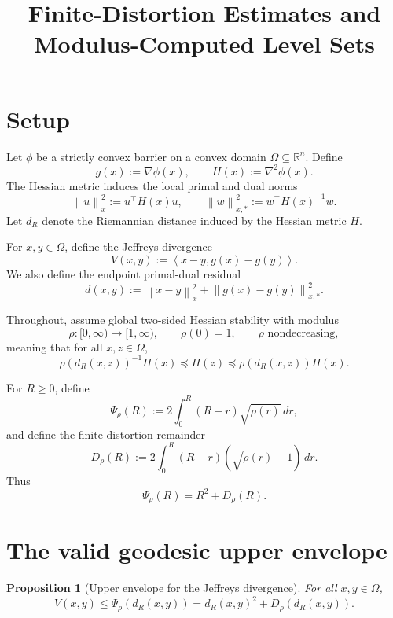\documentclass[11pt]{article}
\title{Finite-Distortion Estimates and Modulus-Computed Level Sets}
\author{}
\date{}
\newtheorem{proposition}{Proposition}
\newcommand{\R}{\mathbb{R}}
\newcommand{\ip}[2]{\left\langle #1,#2\right\rangle}
\newcommand{\norm}[1]{\left\lVert #1\right\rVert}
\begin{document}
\maketitle

\section{Setup}

Let $\phi$ be a strictly convex barrier on a convex domain $\Omega\subseteq\R^n$. Define
\[
    g(x) := \nabla \phi(x),
    \qquad
    H(x) := \nabla^2 \phi(x).
\]
The Hessian metric induces the local primal and dual norms
\[
    \norm{u}_x^2 := u^\top H(x)u,
    \qquad
    \norm{w}_{x,*}^2 := w^\top H(x)^{-1}w.
\]
Let $d_R$ denote the Riemannian distance induced by the Hessian metric $H$.

For $x,y\in\Omega$, define the Jeffreys divergence
\[
    V(x,y)
    :=
    \ip{x-y}{g(x)-g(y)}.
\]
We also define the endpoint primal-dual residual
\[
    d(x,y)
    :=
    \norm{x-y}_x^2
    +
    \norm{g(x)-g(y)}_{x,*}^2.
\]

Throughout, assume global two-sided Hessian stability with modulus
\[
    \rho:[0,\infty)\to[1,\infty),
    \qquad
    \rho(0)=1,
    \qquad
    \rho \text{ nondecreasing},
\]
meaning that for all $x,z\in\Omega$,
\[
    \rho(d_R(x,z))^{-1}H(x)
    \preceq
    H(z)
    \preceq
    \rho(d_R(x,z))H(x).
\]

For $R\ge 0$, define
\[
    \Psi_\rho(R)
    :=
    2\int_0^R (R-r)\sqrt{\rho(r)}\,dr,
\]
and define the finite-distortion remainder
\[
    D_\rho(R)
    :=
    2\int_0^R
    (R-r)\left(\sqrt{\rho(r)}-1\right)\,dr.
\]
Thus
\[
    \Psi_\rho(R)=R^2+D_\rho(R).
\]

\section{The valid geodesic upper envelope}

\begin{proposition}[Upper envelope for the Jeffreys divergence]
For all $x,y\in\Omega$,
\[
    V(x,y)
    \le
    \Psi_\rho(d_R(x,y))
    =
    d_R(x,y)^2 + D_\rho(d_R(x,y)).
\]
\end{proposition}
\end{document}
